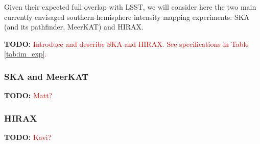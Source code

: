 \documentclass[prd,twocolumn]{revtex4}
\newcommand{\TODO}[1]{{\bf TODO:} \textcolor{red}{#1}}
\begin{document}
    Given their expected full overlap with LSST, we will consider here the two main currently
    envisaged southern-hemisphere intensity mapping experiments: SKA (and its pathfinder,
    MeerKAT) and HIRAX.


    \TODO{Introduce and describe SKA and HIRAX. See specifications in Table \ref{tab:im_exp}.}
    
    \subsubsection{SKA and MeerKAT}\label{sssec:method.imap.ska}
      \TODO{Matt?}
      
    \subsubsection{HIRAX}\label{sssec:method.imap.hirax}
      \TODO{Kavi?}
      
\end{document}
